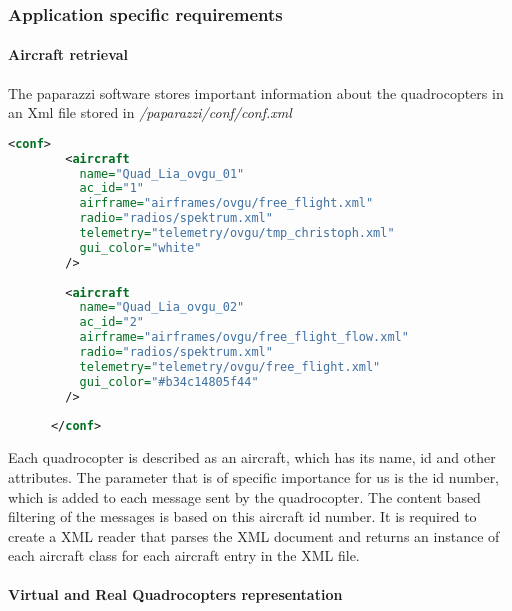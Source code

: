     \subsubsection{Application specific requirements}
    \label{sec:requirementsApplication}
    
    \paragraph{Aircraft retrieval}
    The paparazzi software stores important information about the quadrocopters in an Xml file stored in \textit{/paparazzi/conf/conf.xml}
    
    \begin{lstlisting}[basicstyle=\tiny, label={lst:AircraftXml}, language = Xml]
      <conf>
        <aircraft
          name="Quad_Lia_ovgu_01"
          ac_id="1"
          airframe="airframes/ovgu/free_flight.xml"
          radio="radios/spektrum.xml"
          telemetry="telemetry/ovgu/tmp_christoph.xml"
          gui_color="white"
        />
        
        <aircraft
          name="Quad_Lia_ovgu_02"
          ac_id="2"
          airframe="airframes/ovgu/free_flight_flow.xml"
          radio="radios/spektrum.xml"
          telemetry="telemetry/ovgu/free_flight.xml"
          gui_color="#b34c14805f44"
        />
      
      </conf>
    \end{lstlisting}
    
    Each quadrocopter is described as an aircraft, which has its name, id and other attributes. The parameter that is of specific importance for us is the id number, which is added to each message sent by the quadrocopter. The content based filtering of the messages is based on this aircraft id number. It is required to create a XML reader that parses the XML document and returns an instance of each aircraft class for each aircraft entry in the XML file.
    
    \paragraph{Virtual and Real Quadrocopters representation}
    
